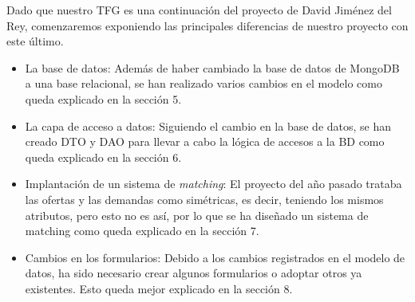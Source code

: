 \documentclass[11pt]{book}
\begin{document}
Dado que nuestro TFG es una continuación del proyecto de David Jiménez del Rey, comenzaremos exponiendo las principales diferencias de nuestro proyecto con este último.
\begin{itemize}
	\item La base de datos: Además de haber cambiado la base de datos de MongoDB a una base relacional, se han realizado varios cambios en el modelo 		como queda explicado en la sección 5.
	\item La capa de acceso a datos: Siguiendo el cambio en la base de datos, se han creado DTO y DAO para llevar a cabo la lógica de accesos a la BD 			como queda explicado en la sección 6.
	\item Implantación de un sistema de \emph{matching}: El proyecto del año pasado trataba las ofertas y las demandas como simétricas, es decir, teniendo los mismos atributos, pero esto no 	es así, por lo que se ha diseñado un sistema de matching como queda explicado en la sección 7.
	\item Cambios en los formularios: Debido a los cambios registrados en el modelo de datos, ha sido necesario crear algunos formularios o adoptar otros ya existentes. Esto queda mejor explicado en la sección 8.
\end{itemize}
\end{document}
